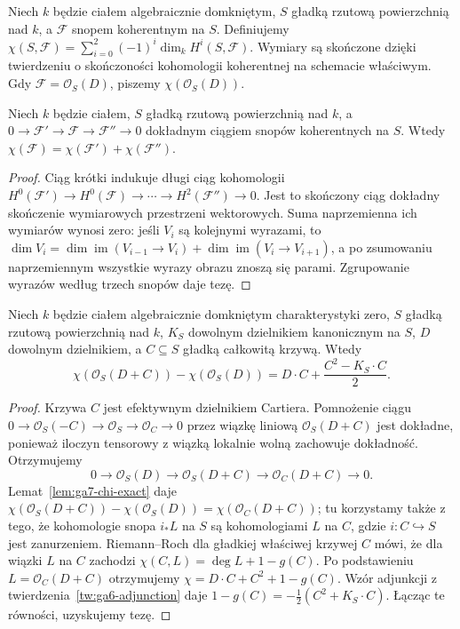 \begin{definicja}
\label{def:ga7-chi}
Niech $k$ będzie ciałem algebraicznie domkniętym,
$S$ gładką rzutową powierzchnią nad $k$, a
$\mathcal F$ snopem koherentnym na $S$. Definiujemy
$\chi(S,\mathcal F)=\sum_{i=0}^{2}(-1)^i
\dim_k H^i(S,\mathcal F)$.
Wymiary są skończone dzięki twierdzeniu o skończoności
kohomologii koherentnej na schemacie właściwym.
Gdy $\mathcal F=\mathcal O_S(D)$, piszemy
$\chi(\mathcal O_S(D))$.
\end{definicja}

\begin{lemat}
\label{lem:ga7-chi-exact}
Niech $k$ będzie ciałem, $S$ gładką rzutową powierzchnią
nad $k$, a $0\to\mathcal F'\to\mathcal F\to\mathcal F''\to0$
dokładnym ciągiem snopów koherentnych na $S$. Wtedy
$\chi(\mathcal F)=\chi(\mathcal F')+\chi(\mathcal F'')$.
\end{lemat}
\begin{proof}
Ciąg krótki indukuje długi ciąg kohomologii
$H^0(\mathcal F')\to H^0(\mathcal F)\to\cdots
\to H^2(\mathcal F'')\to0$.
Jest to skończony ciąg dokładny skończenie wymiarowych
przestrzeni wektorowych. Suma naprzemienna ich wymiarów
wynosi zero: jeśli $V_i$ są kolejnymi wyrazami, to
$\dim V_i=\dim\operatorname{im}(V_{i-1}\to V_i)+
\dim\operatorname{im}(V_i\to V_{i+1})$, a po zsumowaniu
naprzemiennym wszystkie wyrazy obrazu znoszą się parami.
Zgrupowanie wyrazów według trzech snopów daje tezę.
\end{proof}

\begin{lemat}
\label{lem:ga7-rr-increment}
Niech $k$ będzie ciałem algebraicznie domkniętym charakterystyki
zero, $S$ gładką rzutową powierzchnią nad $k$,
$K_S$ dowolnym dzielnikiem kanonicznym na $S$,
$D$ dowolnym dzielnikiem, a $C\subseteq S$ gładką
całkowitą krzywą. Wtedy
\[
\chi(\mathcal O_S(D+C))-\chi(\mathcal O_S(D))
= D\cdot C+\frac{C^2-K_S\cdot C}{2}.
\]
\end{lemat}
\begin{proof}
Krzywa $C$ jest efektywnym dzielnikiem Cartiera.
Pomnożenie ciągu
$0\to\mathcal O_S(-C)\to\mathcal O_S\to\mathcal O_C\to0$
przez wiązkę liniową $\mathcal O_S(D+C)$ jest dokładne,
ponieważ iloczyn tensorowy z wiązką lokalnie wolną
zachowuje dokładność. Otrzymujemy
\[
0\longrightarrow\mathcal O_S(D)
\longrightarrow\mathcal O_S(D+C)
\longrightarrow\mathcal O_C(D+C)\longrightarrow0.
\]
Lemat~\ref{lem:ga7-chi-exact} daje
$\chi(\mathcal O_S(D+C))-\chi(\mathcal O_S(D))
=\chi(\mathcal O_C(D+C))$; tu korzystamy także z tego,
że kohomologie snopa $i_*L$ na $S$ są kohomologiami
$L$ na $C$, gdzie $i:C\hookrightarrow S$ jest zanurzeniem.
Riemann--Roch dla gładkiej właściwej krzywej
$C$ mówi, że dla wiązki $L$ na $C$ zachodzi
$\chi(C,L)=\deg L+1-g(C)$. Po podstawieniu
$L=\mathcal O_C(D+C)$ otrzymujemy
$\chi= D\cdot C+C^2+1-g(C)$.
Wzór adjunkcji z twierdzenia~\ref{tw:ga6-adjunction}
daje $1-g(C)=-\frac12(C^2+K_S\cdot C)$.
Łącząc te równości, uzyskujemy tezę.
\end{proof}

